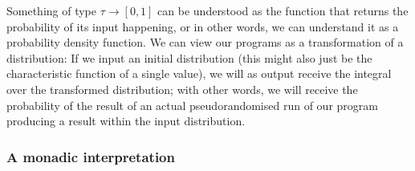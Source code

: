 \documentclass[11pt, leqno, titlepage]{article}
\theoremstyle{definition}
\begin{document}
Something of type $\tau\to[0,1]$ can be understood as the function that returns the
probability of its input happening, or in other words, we can understand it as a
probability density function. We can view our programs as a transformation of a
distribution: If we input an initial distribution (this might also just be the
characteristic function of a single value), we will as output receive the integral
over the transformed distribution; with other words, we will receive the probability
of the result of an actual pseudorandomised run of our program producing a result
within the input distribution.






\subsubsection{A monadic interpretation}
\end{document}
